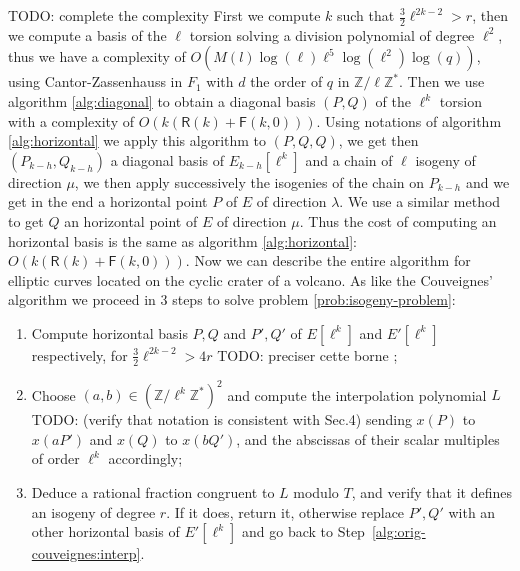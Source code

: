 \documentclass{lms}
\newcommand{\todo}[1]{{\color{red}TODO: #1}}
\newcommand{\F}{\mathbb{F}}
\begin{document}


\todo{complete the complexity}
 First we compute $k$ such that $\frac{3}{2}\ell^{2k-2}>r$, then we compute a basis of the $\ell$ torsion solving a division polynomial of degree $\ell^2$, thus we have a complexity of $O(M(l)\log(\ell) \ell^5 \log(\ell^2) \log(q))$, using Cantor-Zassenhauss in $F_1$ with $d$ the order of $q$ in $\mathbb{Z}/\ell\mathbb{Z}^*$.%
 Then we use algorithm \ref{alg:diagonal} to obtain a diagonal basis $(P,Q)$ of the $\ell^k$ torsion with a complexity of $O(k(\mathsf{R}(k)+\mathsf{F}(k,0)))$. Using notations of algorithm \ref{alg:horizontal} we apply this algorithm to $(P,Q,Q)$, we get then $(P_{k-h},Q_{k-h})$ a diagonal basis of $E_{k-h}[\ell^k]$ and a chain of $\ell$ isogeny of direction $\mu$, we then apply successively the isogenies of the chain on $P_{k-h}$ and we get in the end a horizontal point $P$ of $E$ of direction $\lambda$. We use a similar method to get $Q$ an horizontal point of $E$ of direction $\mu$. Thus the cost of computing an horizontal basis is the same as algorithm \ref{alg:horizontal}: $O(k(\mathsf{R}(k)+\mathsf{F}(k,0)))$.  Now we can describe the entire algorithm for elliptic curves located on the cyclic crater of a volcano.
\newline  
  As like the Couveignes' algorithm we proceed in 3 steps to solve problem \ref{prob:isogeny-problem}:
 \begin{enumerate}
\item Compute horizontal basis $P,Q$ and $P',Q'$ of
  $E[\ell^k]$ and $E'[\ell^k]$ respectively, for $\frac{3}{2}\ell^{2k-2} > 4r$ \todo{preciser cette borne} ;
\item\label{alg:modif-couveignes:interp} Choose $(a,b) \in (\mathbb{Z}/\ell^k\mathbb{Z}^*)^2$ and compute the interpolation
  polynomial $L$ \todo{(verify that notation is consistent
    with Sec.4)} sending $x(P)$ to $x(aP')$ and $x(Q)$ to $x(bQ')$, and the abscissas of
  their scalar multiples of order $\ell^k$ accordingly;
\item\label{alg:modif-couveignes:rational} Deduce a rational fraction
  congruent to $L$ modulo $T$, and verify that it
  defines an isogeny of degree $r$. If it does, return it, otherwise
  replace $P',Q'$ with an other horizontal basis of $E'[\ell^k]$ and go back to
  Step~\ref{alg:orig-couveignes:interp}.
\end{enumerate} 
\end{document}
